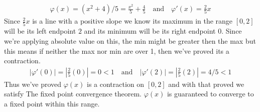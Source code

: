 \documentclass{article}
\begin{document}
\begin{itemize}
\begin{itemize}
        \begin{equation}
        \begin{split}
            \varphi(x) = (x^2 + 4) / 5 = \frac{x^2}{5} + \frac{4}{5} \quad \textrm{and} \quad
            \varphi'(x) = \frac{2}{5}x 
        \end{split}
        \end{equation}
        \newline
        Since $\frac{2}{5}x$ is a line with a positive slope we know its maximum in the range $[0, 2]$ will be its left endpoint $2$ and its minimum will be its right endpoint $0$. Since we're applying absolute value on this, the min might be greater then the max but this means if neither the max nor min are over 1, then we've proved its a contraction.
        \begin{equation}
        \begin{split}
            |\varphi'(0)| = \left|\frac{2}{5}(0)\right| = 0 < 1 \quad \textrm{and} \quad |\varphi'(2)| = \left|\frac{2}{5}(2)\right| = 4/5 < 1
        \end{split}
        \end{equation}
        Thus we've proved $\varphi(x)$ is a contraction on $[0, 2]$ and with that proved we satisfy The fixed point convergence theorem. $\varphi(x)$ is guaranteed to converge to a fixed point within this range. 
    \end{itemize}
    

\end{itemize}
\end{document}
